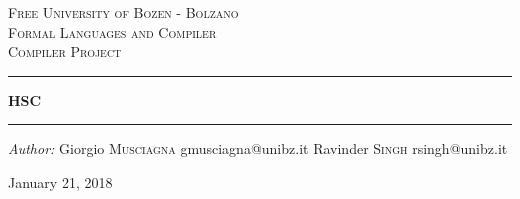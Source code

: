 \documentclass[12pt]{article}
\begin{document}
\begin{titlepage}
\center




\textsc{\LARGE Free University of Bozen - Bolzano}\\[1.5cm]
\textsc{\Large Formal Languages and Compiler}\\[0.5cm]
\textsc{\large Compiler Project}\\[0.5cm]




\vspace{2.5cm}
\hrule
\vspace{1cm}
{\huge \bfseries HSC}
\vspace{1cm}
\hrule
\vspace{3.5cm}




\begin{minipage}{0.95\textwidth}
\begin{flushleft} \large
\emph{Author:}
\newline
\newline
Giorgio \textsc{Musciagna} \hfill gmusciagna@unibz.it
\newline
Ravinder \textsc{Singh} \hfill rsingh@unibz.it
\end{flushleft}
\end{minipage}




\vfill
{\large January 21, 2018}




\end{titlepage}




\end{document}
